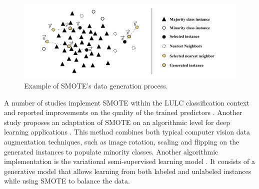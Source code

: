 \documentclass[parskip=full]{scrartcl}
\begin{document}
\begin{figure}[H]
	\centering
	\includegraphics[width=1\linewidth]{../analysis/smote_example}
	\caption{Example of SMOTE's data generation process.}
	\label{fig:smote_example}
\end{figure}

A number of studies implement SMOTE within the LULC classification context and
reported improvements on the quality of the trained predictors
\cite{Jozdani2019, Bogner2018}. Another study proposes an adaptation of SMOTE on
an algorithmic level for deep learning applications \cite{Zhu2020}. This method
combines both typical computer vision data augmentation techniques, such as
image rotation, scaling and flipping on the generated instances to populate
minority classes. Another algorithmic implementation is the variational
semi-supervised learning model \cite{Cenggoro2018}. It consists of a generative
model that allows learning from both labeled and unlabeled instances while
using SMOTE to balance the data.
\end{document}
